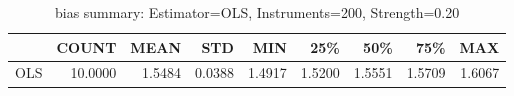 \begin{table}[ht]
\centering
\caption{bias summary: Estimator=OLS, Instruments=200, Strength=0.20}
\begin{tabular}{lrrrrrrrr}
\toprule
 & COUNT & MEAN & STD & MIN & 25\% & 50\% & 75\% & MAX \\
\midrule
OLS & 10.0000 & 1.5484 & 0.0388 & 1.4917 & 1.5200 & 1.5551 & 1.5709 & 1.6067 \\
\bottomrule
\end{tabular}
\end{table}
